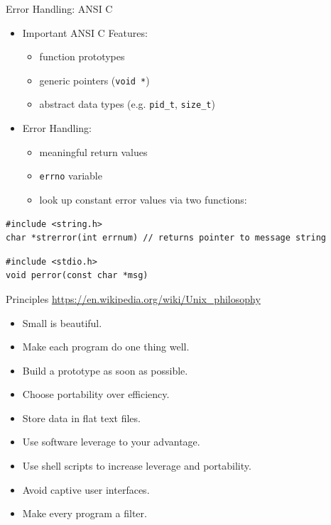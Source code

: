 \documentclass[newPxFont,sthlmFooter,nooffset]{beamer}
\begin{document}
\begin{frame}[containsverbatim,t]{Error Handling: ANSI C}
\begin{itemize}
	\item	Important ANSI C Features:
		\begin{itemize}
			\item function prototypes
			\item generic pointers ({\tt void *})
			\item abstract data types (e.g. {\tt pid\_t}, {\tt size\_t})
		\end{itemize}
	\item	Error Handling:
		\begin{itemize}
			\item meaningful return values
			\item {\tt errno} variable
			\item look up constant error values via two functions:
		\end{itemize}
\end{itemize}

\begin{lstlisting}
#include <string.h>
char *strerror(int errnum) // returns pointer to message string
\end{lstlisting}

\bigskip

\begin{lstlisting}
#include <stdio.h>
void perror(const char *msg)
\end{lstlisting}

\end{frame}

\begin{frame}[t]{Principles}
\url{https://en.wikipedia.org/wiki/Unix_philosophy}
\bigskip
\begin{itemize}
\item Small is beautiful.
\item Make each program do one thing well.
\item Build a prototype as soon as possible.
\item Choose portability over efficiency.
\item Store data in flat text files.
\item Use software leverage to your advantage.
\item Use shell scripts to increase leverage and portability.
\item Avoid captive user interfaces.
\item Make every program a filter.
\end{itemize}
\end{frame}
\end{document}
